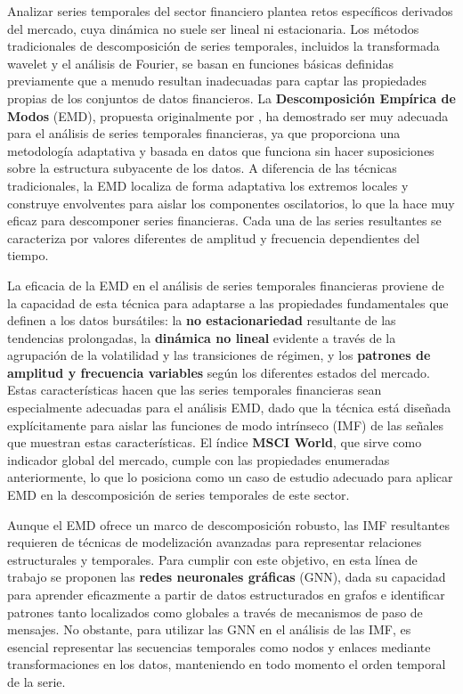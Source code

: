 \documentclass[11pt,a4paper]{article}
\begin{document}
Analizar series temporales del sector financiero plantea retos específicos derivados del mercado, cuya dinámica no suele ser lineal ni estacionaria. Los métodos tradicionales de descomposición de series temporales, incluidos la transformada wavelet y el análisis de Fourier, se basan en funciones básicas definidas previamente que a menudo resultan inadecuadas para captar las propiedades propias de los conjuntos de datos financieros. La \textbf{Descomposición Empírica de Modos} (EMD), propuesta originalmente por \citep{huang1998empirical}, ha demostrado ser muy adecuada para el análisis de series temporales financieras, ya que proporciona una metodología adaptativa y basada en datos que funciona sin hacer suposiciones sobre la estructura subyacente de los datos. A diferencia de las técnicas tradicionales, la EMD localiza de forma adaptativa los extremos locales y construye envolventes para aislar los componentes oscilatorios, lo que la hace muy eficaz para descomponer series financieras. Cada una de las series resultantes se caracteriza por valores diferentes de amplitud y frecuencia dependientes del tiempo.

La eficacia de la EMD en el análisis de series temporales financieras proviene de la capacidad de esta técnica para adaptarse a las propiedades fundamentales que definen a los datos bursátiles: la \textbf{no estacionariedad} resultante de las tendencias prolongadas, la \textbf{dinámica no lineal} evidente a través de la agrupación de la volatilidad y las transiciones de régimen, y los \textbf{patrones de amplitud y frecuencia variables} según los diferentes estados del mercado. Estas características hacen que las series temporales financieras sean especialmente adecuadas para el análisis EMD, dado que la técnica está diseñada explícitamente para aislar las funciones de modo intrínseco (IMF) de las señales que muestran estas características. El índice \textbf{MSCI World}, que sirve como indicador global del mercado, cumple con las propiedades enumeradas anteriormente, lo que lo posiciona como un caso de estudio adecuado para aplicar EMD en la descomposición de series temporales de este sector.

Aunque el EMD ofrece un marco de descomposición robusto, las IMF resultantes requieren de técnicas de modelización avanzadas para representar relaciones estructurales y temporales. Para cumplir con este objetivo, en esta línea de trabajo se proponen las \textbf{redes neuronales gráficas} (GNN), dada su capacidad para aprender eficazmente a partir de datos estructurados en grafos e identificar patrones tanto localizados como globales a través de mecanismos de paso de mensajes. No obstante, para utilizar las GNN en el análisis de las IMF, es esencial representar las secuencias temporales como nodos y enlaces mediante transformaciones en los datos, manteniendo en todo momento el orden temporal de la serie.
\end{document}
